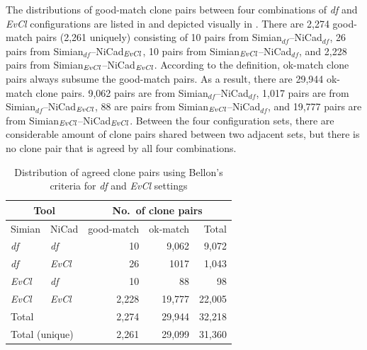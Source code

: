 \documentclass{sig-alternate-05-2015}
\newcommand\FIXME[1]{\textbf{FIXME: #1}}
\begin{document}
The distributions of good-match clone pairs between four combinations of \textit{df} and \textit{EvCl} configurations are listed in  and depicted visually in . There are 2,274 good-match pairs (2,261 uniquely) consisting of 10 pairs from Simian$_{df}$--NiCad$_{df}$, 26 pairs from Simian$_{df}$--NiCad$_{\textrm{\textit{EvCl}}}$, 10 pairs from Simian$_{\textrm{\textit{EvCl}}}$--NiCad$_{df}$, and 2,228 pairs from Simian$_{\textrm{\textit{EvCl}}}$--NiCad$_{\textrm{\textit{EvCl}}}$. According to the definition, ok-match clone pairs always subsume the good-match pairs. As a result, there are 29,944 ok-match clone pairs. 9,062 pairs are from Simian$_{df}$--NiCad$_{df}$, 1,017 pairs are from Simian$_{df}$--NiCad$_{\textrm{\textit{EvCl}}}$, 88 are pairs from Simian$_{\textrm{\textit{EvCl}}}$--NiCad$_{df}$, and 19,777 pairs are from Simian$_{\textrm{\textit{EvCl}}}$--NiCad$_{\textrm{\textit{EvCl}}}$. Between the four configuration sets, there are considerable amount of clone pairs shared between two adjacent sets, but there is no clone pair that is agreed by all four combinations.


\begin{table}[H]
	\centering
	\caption{Distribution of agreed clone pairs using Bellon's criteria for \textit{df} and \textit{EvCl} settings}
	\label{t_agreed_good_clone_pairs}
	\small
	\begin{tabular}{l|l|r|r|r}
		\hline
		\multicolumn{2}{c|}{Tool} & \multicolumn{3}{c}{No.~of clone pairs}   \\
		\hline
		Simian          & NiCad             & good-match & ok-match & Total  \\
		\hline
		\textit{df}     & \textit{df}       & 10 	     & 9,062    & 9,072  \\ 
		\textit{df}     & \textit{EvCl}     & 26 	     & 1017     & 1,043  \\ 
		\textit{EvCl} 	& \textit{df} 	    & 10 	     & 88       & 98     \\
		\textit{EvCl} 	& \textit{EvCl}     & 2,228      & 19,777   & 22,005 \\ 
		\hline
		\multicolumn{2}{l|}{Total}          & 2,274      & 29,944   & 32,218 \\
		\hline
		\multicolumn{2}{l|}{Total (unique)} & 2,261      & 29,099   & 31,360 \\
		\hline
	\end{tabular}
\end{table}
\end{document}
